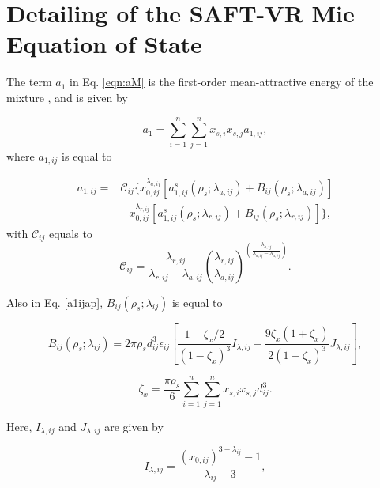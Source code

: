 
\chapter{Detailing of the SAFT-VR Mie Equation of State } \label{restodaseq}
The term $a_{1}$  in Eq. \ref{eqn:aM} is the first-order mean-attractive energy of the mixture \cite{lafitte2013}, and is given by

\begin{equation}
a_{1} = \sum_{i=1}^{n} \sum_{j=1}^{n} x_{s,i} x_{s,j} a_{1,ij},
\end{equation}	
where $a_{1,ij}$ is equal to

\begin{equation}
\begin{aligned}
a_{1,ij} {}=& \mathcal{C}_{ij} \lbrace x_{0,ij}^{\lambda _{a,ij}} [a_{1,ij}^{s}(\rho _{s}; \lambda _{a,ij}) + B_{ij}(\rho _{s}; \lambda _{a,ij})] \\
& - x_{0,ij}^{\lambda _{r,ij}} [a_{1,ij}^{s}(\rho _{s}; \lambda _{r,ij}) + B_{ij}(\rho _{s}; \lambda _{r,ij})] \rbrace ,
\end{aligned}
\label{a1ijap}
\end{equation}
with $\mathcal{C}_{ij}$ equals to
\begin{equation}
\mathcal{C}_{ij} = \frac{\lambda_{r,ij}}{\lambda_{r,ij} - \lambda_{a,ij}} \left(\frac{\lambda_{r,ij}}{\lambda_{a,ij}} \right)^{\left( \frac{\lambda_{a,ij}}{\lambda_{a,ij} - \lambda_{a,ij}} \right)}.
\end{equation}

Also in Eq. \ref{a1ijap}, $B_{ij}(\rho _{s}; \lambda _{ij})$ is equal to

\begin{equation}
B_{ij}(\rho _{s}; \lambda _{ij}) =  2 \pi \rho _{s} d_{ij}^{3} \epsilon _{ij} \left[\dfrac{1 - \zeta _{x}/2}{(1-\zeta _{x})^3} I_{\lambda , ij} - \dfrac{9 \zeta _{x} (1 + \zeta _{x})}{2(1-\zeta _{x})^3} J_{\lambda , ij} \right],
\end{equation}

\begin{equation}
\zeta _{x} = \frac{\pi \rho _{s}}{6} \sum_{i=1}^{n} \sum_{j=1}^{n} x_{s,i} x_{s,j} d_{ij}^{3} .
\end{equation}

Here, $I_{\lambda , ij}$ and $J_{\lambda , ij}$ are given by

\begin{equation}
I_{\lambda , ij} = \dfrac{ (x_{0,ij})^{3 - \lambda _{ij}} - 1}{\lambda _{ij} -3},
\end{equation}

